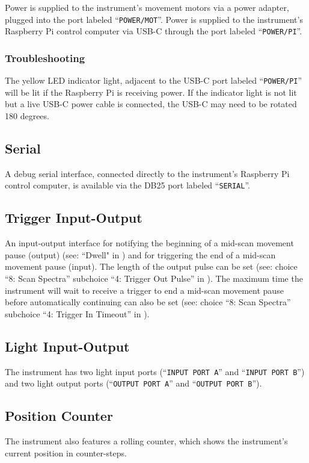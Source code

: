 \documentclass{article}
\begin{document}
Power is supplied to the instrument's movement motors via a power adapter, plugged into the port labeled ``\verb|POWER/MOT|''. Power is supplied to the instrument's Raspberry Pi control computer via USB-C through the port labeled ``\verb|POWER/PI|''. 

\subsubsection{Troubleshooting}

The yellow LED indicator light, adjacent to the USB-C port labeled ``\verb|POWER/PI|'' will be lit if the Raspberry Pi is receiving power. If the indicator light is not lit but a live USB-C power cable is connected, the USB-C may need to be rotated 180 degrees.

\subsection{Serial}

A debug serial interface, connected directly to the instrument's Raspberry Pi control computer, is available via the DB25 port labeled ``\verb|SERIAL|''.

\subsection{Trigger Input-Output} \label{subsection:triggerio}

An input-output interface for notifying the beginning of a mid-scan movement pause (output) (see: ``Dwell" in ) and for triggering the end of a mid-scan movement pause (input). The length of the output pulse can be set (see: choice ``8: Scan Spectra'' subchoice ``4: Trigger Out Pulse'' in ). The maximum time the instrument will wait to receive a trigger to end a mid-scan movement pause before automatically continuing can also be set (see: choice ``8: Scan Spectra'' subchoice ``4: Trigger In Timeout'' in ).

\subsection{Light Input-Output}

The instrument has two light input ports (``\verb|INPUT PORT A|'' and ``\verb|INPUT PORT B|'') and two light output ports (``\verb|OUTPUT PORT A|'' and ``\verb|OUTPUT PORT B|'').

\subsection{Position Counter}

The instrument also features a rolling counter, which shows the instrument's current position in counter-steps.
\end{document}
